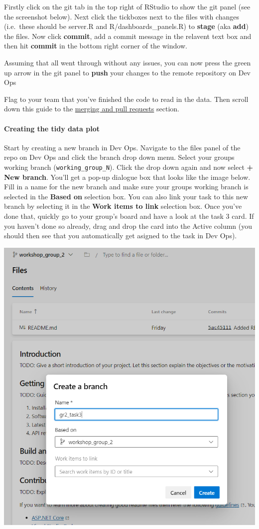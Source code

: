 \documentclass[
  12pt,
]{article}
\begin{document}
Firstly click on the git tab in the top right of RStudio to show the git
panel (see the screenshot below). Next click the tickboxes next to the
files with changes (i.e.~these should be server.R and
R/dashboards\_panels.R) to \textbf{stage} (aka \textbf{add}) the files.
Now click \textbf{commit}, add a commit message in the relavent text box
and then hit \textbf{commit} in the bottom right corner of the window.

Assuming that all went through without any issues, you can now press the
green up arrow in the git panel to \textbf{push} your changes to the
remote repository on Dev Ops

Flag to your team that you've finished the code to read in the data.
Then scroll down this guide to the
\protect\hyperlink{merging-and-pull-requests}{merging and pull requests}
section.

\hypertarget{creating-the-tidy-data-plot}{%
\paragraph{Creating the tidy data
plot}\label{creating-the-tidy-data-plot}}

Start by creating a new branch in Dev Ops. Navigate to the files panel
of the repo on Dev Ops and click the branch drop down menu. Select your
groups working branch (\texttt{working\_group\_N}). Click the drop down
again and now select \textbf{+ New branch}. You'll get a pop-up dialogue
box that looks like the image below. Fill in a name for the new branch
and make sure your groups working branch is selected in the
\textbf{Based on} selection box. You can also link your task to this new
branch by selecting it in the \textbf{Work items to link} selection box.
Once you've done that, quickly go to your group's board and have a look
at the task 3 card. If you haven't done so already, drag and drop the
card into the Active column (you should then see that you automatically
get asigned to the task in Dev Ops).

\begin{center}\includegraphics[width=0.64\linewidth]{images/DevOpsdemo/DevOps_Repo_newbranch} \end{center}
\end{document}
